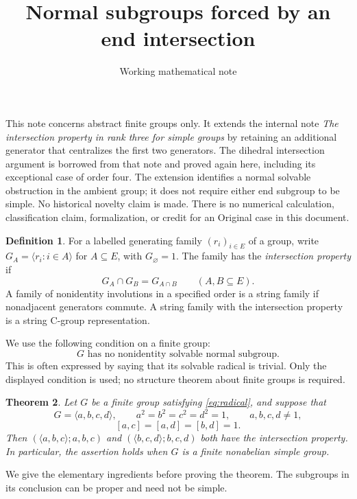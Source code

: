 \documentclass[11pt]{article}
\title{Normal subgroups forced by an end intersection}
\author{Working mathematical note}
\date{}
\newtheorem{theorem}{Theorem}
\theoremstyle{definition}\newtheorem{definition}[theorem]{Definition}
\newcommand{\gen}[1]{\langle #1\rangle}
\begin{document}
\maketitle

This note concerns abstract finite groups only.  It extends the internal
note \emph{The intersection property in rank three for simple groups} by
retaining an additional generator that centralizes the first two generators.
The dihedral intersection argument is borrowed from that note and proved
again here, including its exceptional case of order four.  The extension
identifies a normal solvable obstruction in the ambient group; it does not
require either end subgroup to be simple.  No historical novelty claim is
made.  There is no numerical calculation, classification claim, formalization,
or credit for an Original case in this document.

\begin{definition}
For a labelled generating family $(r_i)_{i\in E}$ of a group, write
$G_A=\gen{r_i:i\in A}$ for $A\subseteq E$, with $G_\varnothing=1$.
The family has the \emph{intersection property} if
\[
                 G_A\cap G_B=G_{A\cap B}
                 \qquad(A,B\subseteq E).
\]
A family of nonidentity involutions in a specified order is a string family
if nonadjacent generators commute.  A string family with the intersection
property is a string C-group representation.
\end{definition}

We use the following condition on a finite group:
\begin{equation}\label{eq:radical}
 \text{$G$ has no nonidentity solvable normal subgroup.}
\end{equation}
This is often expressed by saying that its solvable radical is trivial.
Only the displayed condition is used; no structure theorem about finite
groups is required.

\begin{theorem}\label{thm:ends}
Let $G$ be a finite group satisfying \eqref{eq:radical}, and suppose that
\[
 G=\gen{a,b,c,d},\qquad a^2=b^2=c^2=d^2=1,
 \qquad a,b,c,d\ne1,
\]
\[
                         [a,c]=[a,d]=[b,d]=1.
\]
Then $(\gen{a,b,c};a,b,c)$ and $(\gen{b,c,d};b,c,d)$ both have the
intersection property.  In particular, the assertion holds when $G$ is a
finite nonabelian simple group.
\end{theorem}

We give the elementary ingredients before proving the theorem.  The
subgroups in its conclusion can be proper and need not be simple.
\end{document}
